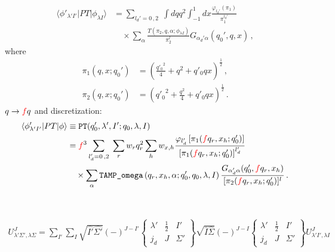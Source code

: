 \documentclass[11pt,aps]{revtex4}
\newcommand{\PF}{{\color{red}f}}
\begin{document}
\begin{equation}
\begin{split}
  \langle \phi'_{\lambda' I'} | P T | \phi_{\lambda I} \rangle &= \sum_{l_d' = 0\, , 2} \; \int dq q^2 \int_{-1}^{1} dx \frac{\varphi_{l_d'}(\pi_1)}{\pi_1^{l_d'}} \\
  & \quad \times  \sum_{\alpha} \frac{T(\pi_2, q, \alpha; \phi_{\lambda I})}{\pi_2^{l}} G_{\alpha_d' \alpha} (q_0', q, x) \, ,
\end{split}
\end{equation}
where
\begin{equation}
\begin{split}
  \pi_1(q, x; q_0') &= \left(\frac{{q'_0}^2}{4} + q^2 + {q'_0} q x \right)^{\frac{1}{2}} \, ,\\
  \pi_2(q, x; q_0') &= \left({q'_0}^2 + \frac{q^2}{4} + {q'_0} q x \right)^{\frac{1}{2}} \, .
\end{split}
\end{equation}
$q \to \PF q$ and discretization:
\begin{equation}
\begin{split}
  \langle \phi'_{\lambda' I'} | P T | \phi \rangle &\equiv \texttt{PT}(q_0', \lambda', I'; q_0, \lambda, I)   \\
  &= \PF^3 \sum_{l_d' = 0\, , 2} \;
  \sum_r w_{r} q_r^2 \sum_h w_{x, h} \frac{\varphi_{l_d'}\left[\pi_1(\PF q_r, x_h; q_0')\right]}{\left[\pi_1(\PF q_r, x_h; q_0')\right]^{l_d'}} \\
  & \quad \times  \sum_{\alpha} \texttt{TAMP\_omega}\left(q_r, x_h, \alpha;  q_0', q_0, \lambda, I\right) \frac{G_{\alpha_d' \alpha} (q_0', \PF q_r, x_h)}{[\pi_2(\PF q_r, x_h; q_0')]^{l}} \, .
\end{split}
\end{equation}
\\
\\
\begin{equation}
\begin{split}
U^J_{\lambda'\Sigma',\lambda\Sigma}=\sum_{I'}\sum_{I}\sqrt{\hat{I'}\hat{\Sigma'}}(-)^{J-I'}
\begin{Bmatrix} 
\lambda' & \frac 1 2  & I'\\ 
j_d & J & \Sigma' 
\end{Bmatrix}
\sqrt{\hat{I}\hat{\Sigma}}(-)^{J-I}
\begin{Bmatrix} 
\lambda' & \frac 1 2  & I'\\ 
j_d & J & \Sigma' 
\end{Bmatrix}
U^J_{\lambda'I',\lambda I}
\end{split}
\end{equation}
\end{document}
